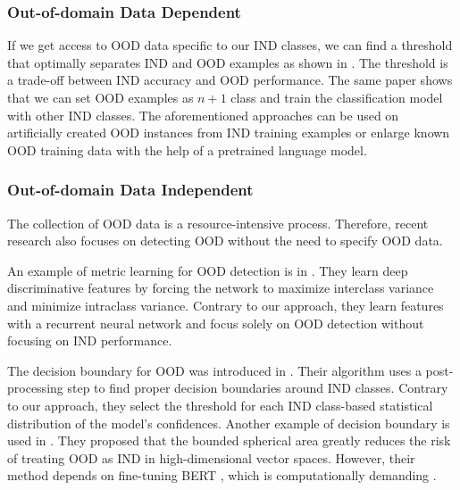 \documentclass[runningheads]{llncs}
\begin{document}
\subsubsection{Out-of-domain Data Dependent}

If we get access to OOD data specific to our IND classes, we can find a threshold that optimally separates IND and OOD examples as shown in \cite{larson2019evaluation_clinc_dataset}. The threshold is a trade-off between IND accuracy and OOD performance. The same paper shows that we can set OOD examples as $n+1$ class and train the classification model with other IND classes. The aforementioned approaches can be used on artificially created OOD instances from IND training examples \cite{odist} or enlarge known OOD training data \cite{chen2021gold} with the help of a pretrained language model. 

\subsubsection{Out-of-domain Data Independent}

The collection of OOD data is a resource-intensive process. Therefore, recent research also focuses on detecting OOD without the need to specify OOD data. 

An example of metric learning for OOD detection is in \cite{lin2019margin_loss}. They learn deep discriminative features by forcing the network to maximize interclass variance and minimize intraclass variance. Contrary to our approach, they learn features with a recurrent neural network and focus solely on OOD detection without focusing on IND performance.

The decision boundary for OOD was introduced in \cite{shu2017doc}. Their algorithm uses a post-processing step to find proper decision boundaries around IND classes. Contrary to our approach, they select the threshold for each IND class-based statistical distribution of the model's confidences. Another example of decision boundary is used in \cite{zhang2021adaptive_decision_boundary}. They proposed that the bounded spherical area greatly reduces the risk of treating OOD as IND in high-dimensional vector spaces. However, their method depends on fine-tuning BERT \cite{devlin2019bert}, which is computationally demanding \cite{reimers2019sentencebert}.
\end{document}
